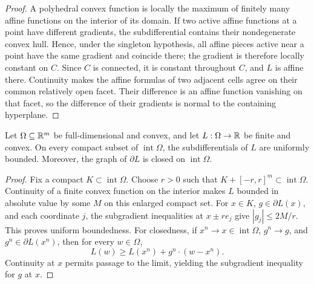 \begin{proof}
A polyhedral convex function is locally the maximum of finitely many affine functions on the interior of its domain. If two active affine functions at a point have different gradients, the subdifferential contains their nondegenerate convex hull. Hence, under the singleton hypothesis, all affine pieces active near a point have the same gradient and coincide there; the gradient is therefore locally constant on $C$. Since $C$ is connected, it is constant throughout $C$, and $L$ is affine there. Continuity makes the affine formulas of two adjacent cells agree on their common relatively open facet. Their difference is an affine function vanishing on that facet, so the difference of their gradients is normal to the containing hyperplane.
\end{proof}

\begin{lemma}\label{lem:subgradient-compactness}
Let $\Omega\subseteq\mathbb{R}^m$ be full-dimensional and convex, and let $L:\Omega\to\mathbb{R}$ be finite and convex. On every compact subset of $\operatorname{int}\Omega$, the subdifferentials of $L$ are uniformly bounded. Moreover, the graph of $\partial L$ is closed on $\operatorname{int}\Omega$.
\end{lemma}

\begin{proof}
Fix a compact $K\subset\operatorname{int}\Omega$. Choose $r>0$ such that $K+[-r,r]^m\subset\operatorname{int}\Omega$. Continuity of a finite convex function on the interior makes $L$ bounded in absolute value by some $M$ on this enlarged compact set. For $x\in K$, $g\in\partial L(x)$, and each coordinate $j$, the subgradient inequalities at $x\pm re_j$ give $|g_j|\le 2M/r$. This proves uniform boundedness. For closedness, if $x^n\to x\in\operatorname{int}\Omega$, $g^n\to g$, and $g^n\in\partial L(x^n)$, then for every $w\in\Omega$,
\[
L(w)\ge L(x^n)+g^n\cdot(w-x^n).
\]
Continuity at $x$ permits passage to the limit, yielding the subgradient inequality for $g$ at $x$.
\end{proof}


